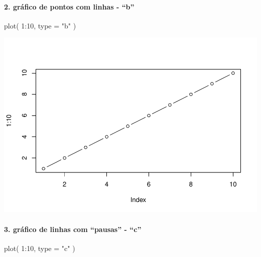 \documentclass[
]{article}
\newenvironment{Shaded}{\begin{snugshade}}{\end{snugshade}}
\newcommand{\AttributeTok}[1]{\textcolor[rgb]{0.77,0.63,0.00}{#1}}
\newcommand{\DecValTok}[1]{\textcolor[rgb]{0.00,0.00,0.81}{#1}}
\newcommand{\FunctionTok}[1]{\textcolor[rgb]{0.00,0.00,0.00}{#1}}
\newcommand{\NormalTok}[1]{#1}
\newcommand{\SpecialCharTok}[1]{\textcolor[rgb]{0.00,0.00,0.00}{#1}}
\newcommand{\StringTok}[1]{\textcolor[rgb]{0.31,0.60,0.02}{#1}}
\begin{document}
\hypertarget{gruxe1fico-de-pontos-com-linhas---b}{%
\paragraph{2. gráfico de pontos com linhas -
``b''}\label{gruxe1fico-de-pontos-com-linhas---b}}

\begin{Shaded}
\begin{Highlighting}[]
\FunctionTok{plot}\NormalTok{( }\DecValTok{1}\SpecialCharTok{:}\DecValTok{10}\NormalTok{, }\AttributeTok{type =} \StringTok{"b"}\NormalTok{ )}
\end{Highlighting}
\end{Shaded}

\includegraphics{presencial_função_plot_04_turma_B_files/figure-latex/unnamed-chunk-3-1.pdf}

\hypertarget{gruxe1fico-de-linhas-com-pausas---c}{%
\paragraph{3. gráfico de linhas com ``pausas'' -
``c''}\label{gruxe1fico-de-linhas-com-pausas---c}}

\begin{Shaded}
\begin{Highlighting}[]
\FunctionTok{plot}\NormalTok{( }\DecValTok{1}\SpecialCharTok{:}\DecValTok{10}\NormalTok{, }\AttributeTok{type =} \StringTok{"c"}\NormalTok{ )}
\end{Highlighting}
\end{Shaded}
\end{document}
